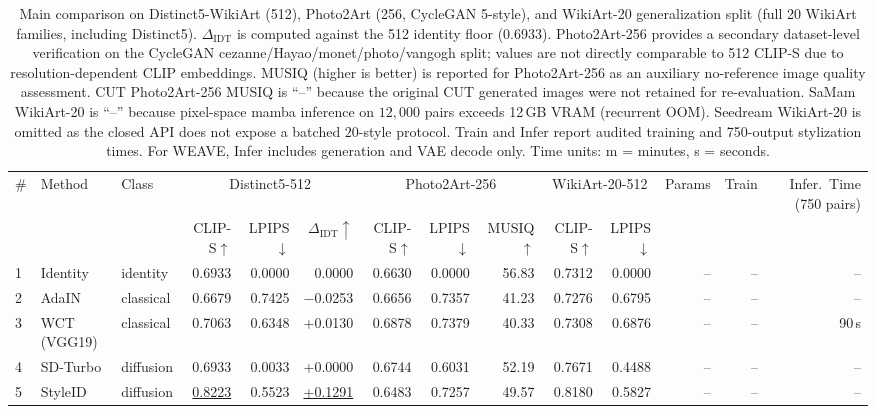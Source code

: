 \documentclass[letterpaper]{article}
\begin{document}
\begin{table}[t]
\centering
\caption{Main comparison on Distinct5-WikiArt (512), Photo2Art (256, CycleGAN 5-style), and WikiArt-20 generalization split (full 20 WikiArt families, including Distinct5). $\Delta_{\mathrm{IDT}}$ is computed against the 512 identity floor (0.6933). Photo2Art-256 provides a secondary dataset-level verification on the CycleGAN cezanne/Hayao/monet/photo/vangogh split; values are not directly comparable to 512 CLIP-S due to resolution-dependent CLIP embeddings. MUSIQ (higher is better) is reported for Photo2Art-256 as an auxiliary no-reference image quality assessment. CUT Photo2Art-256 MUSIQ is ``--'' because the original CUT generated images were not retained for re-evaluation. SaMam WikiArt-20 is ``--'' because pixel-space mamba inference on $12{,}000$ pairs exceeds 12\,GB VRAM (recurrent OOM). Seedream WikiArt-20 is omitted as the closed API does not expose a batched $20$-style protocol. Train and Infer report audited training and 750-output stylization times. For WEAVE, Infer includes generation and VAE decode only. Time units: m = minutes, s = seconds.}
\label{tab:main}
\scriptsize
\renewcommand{\arraystretch}{0.78}
\setlength{\tabcolsep}{3.2pt}
\begin{tabular}{@{}lllrrrrrrrrrrr@{}}
\toprule
\# & Method & Class & \multicolumn{3}{c}{Distinct5-512} & \multicolumn{3}{c}{Photo2Art-256} & \multicolumn{2}{c}{WikiArt-20-512} & Params & Train & Infer.\ Time (750 pairs) \\
\cmidrule(lr){4-6} \cmidrule(lr){7-9} \cmidrule(lr){10-11}
& & & CLIP-S$\uparrow$ & LPIPS$\downarrow$ & $\Delta_{\mathrm{IDT}}\uparrow$ & CLIP-S$\uparrow$ & LPIPS$\downarrow$ & MUSIQ$\uparrow$ & CLIP-S$\uparrow$ & LPIPS$\downarrow$ & & & \\
\midrule
1 & Identity & identity & 0.6933 & 0.0000 & 0.0000 & 0.6630 & 0.0000 & 56.83 & 0.7312 & 0.0000 & -- & -- & -- \\
2 & AdaIN & classical & 0.6679 & 0.7425 & $-$0.0253 & 0.6656 & 0.7357 & 41.23 & 0.7276 & 0.6795 & -- & -- & -- \\
3 & WCT (VGG19) & classical & 0.7063 & 0.6348 & +0.0130 & 0.6878 & 0.7379 & 40.33 & 0.7308 & 0.6876 & -- & -- & 90\,s \\
4 & SD-Turbo & diffusion & 0.6933 & 0.0033 & +0.0000 & 0.6744 & 0.6031 & 52.19 & 0.7671 & 0.4488 & -- & -- & -- \\
5 & StyleID & diffusion & \underline{0.8223} & 0.5523 & \underline{+0.1291} & 0.6483 & 0.7257 & 49.57 & 0.8180 & 0.5827 & -- & -- & -- \\

\end{tabular}
\end{table}
\end{document}
